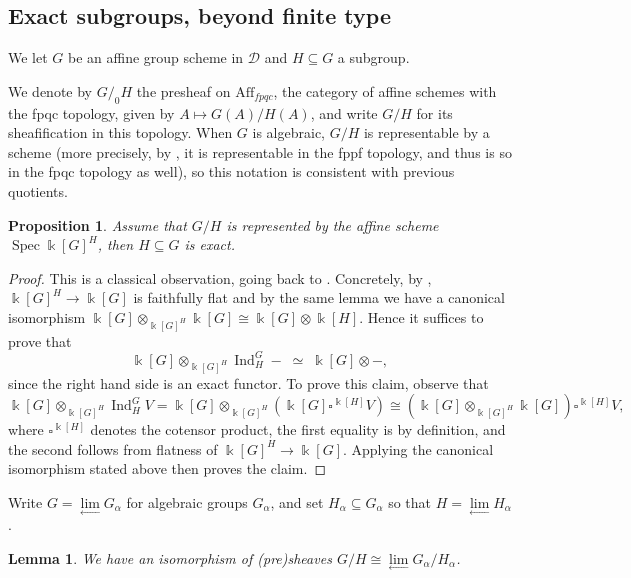 \documentclass[11pt]{amsart}
\def\Ind{\operatorname{Ind}}
\def\Ds{\mathscr{D}}
\def\bk{\Bbbk}
\def\Spec{\operatorname{Spec}}
\def\sub{\subseteq}
\newtheorem{lemma}[thm]{Lemma}
\newtheorem{prop}[thm]{Proposition}
\theoremstyle{definition}
\theoremstyle{remark}
\numberwithin{equation}{section}
\begin{document}
\subsection{Exact subgroups, beyond finite type}\label{sec:charobs}



We let $G$ be an affine group scheme in $\Ds$ and $H\sub G$ a subgroup.




    
	We denote by $G/_0H$ the presheaf on $\text{Aff}_{fpqc}$, the category of affine schemes with the fpqc topology, given by $A\mapsto G(A)/H(A)$, and write ${G/H}$ for its sheafification in this topology. When $G$ is algebraic, $G/H$ is representable by a scheme (more precisely, by \cite{CS}, it is representable in the fppf topology, and thus is so in the fpqc topology as well), so this notation is consistent with previous quotients. 
\begin{prop}\label{prop:GHaff}
    Assume that $G/H$ is represented by the affine scheme $\Spec \bk[G]^H$, then $H\sub G$ is exact.
\end{prop}
\begin{proof}
    This is a classical observation, going back to \cite[\S 4]{CPS}. Concretely, by \cite[Lemma~5.3]{CS}, $\bk[G]^H\to\bk[G]$ is faithfully flat and by the same lemma we have a canonical isomorphism $\bk[G]\otimes_{\bk[G]^H}\bk[G]\cong \bk[G]\otimes \bk[H]$. Hence it suffices to prove that
\[
\bk[G]\otimes_{\bk[G]^H}\Ind^G_H-\;\simeq\; \bk[G]\otimes-,
\]
since the right hand side is an exact functor.  To prove this claim, observe that
\[
\bk[G]\otimes_{\bk[G]^H}\Ind^G_HV=\Bbbk[G]\otimes_{\Bbbk[G]^H}(\Bbbk[G]\square^{\Bbbk[H]} V)\cong (\Bbbk[G]\otimes_{\Bbbk[G]^H}\Bbbk[G])\square^{\Bbbk[H]} V,
\]
where $\square^{\Bbbk[H]}$ denotes the cotensor product, the first equality is by definition, and the second follows from flatness of $\Bbbk[G]^H\to\Bbbk[G]$.  Applying the canonical isomorphism stated above then proves the claim.
\end{proof}



    
    Write $G=\lim\limits_{\leftarrow}G_{\alpha}$ for algebraic groups $G_{\alpha}$, and set $H_{\alpha}\sub G_{\alpha}$ so that $H=\lim\limits_{\leftarrow}H_{\alpha}$.  
	\begin{lemma}\label{lem:limsheaves}
		We have an isomorphism of (pre)sheaves ${G/H}\cong\lim\limits_{\leftarrow}{G_{\alpha}/H_{\alpha}}$.  
	\end{lemma}
\end{document}
